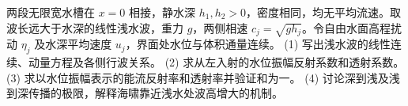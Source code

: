 两段无限宽水槽在 \(x=0\) 相接，静水深 \(h_1,h_2>0\)，密度相同，均无平均流速。取波长远大于水深的线性浅水波，重力 \(g\)，两侧相速 \(c_j=\sqrt{gh_j}\)。令自由水面高程扰动 \(\eta_j\) 及水深平均速度 \(u_j\)，界面处水位与体积通量连续。
(1) 写出浅水波的线性连续、动量方程及各侧行波关系。
(2) 求从左入射的水位振幅反射系数和透射系数。
(3) 求以水位振幅表示的能流反射率和透射率并验证和为一。
(4) 讨论深到浅及浅到深传播的极限，解释海啸靠近浅水处波高增大的机制。
